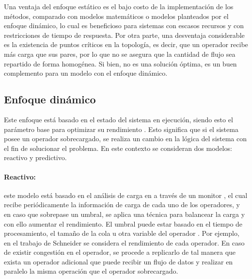 Una ventaja del enfoque est\'atico es el bajo costo de la implementaci\'on de los m\'etodos, comparado con modelos matem\'aticos o modelos planteados por el enfoque din\'amico, lo cual es beneficioso para sistemas con escasos recursos y con restricciones de tiempo de respuesta. Por otra parte, una desventaja considerable es la existencia de puntos cr\'iticos en la topolog\'ia, es decir, que un operador recibe m\'as carga que sus pares, por lo que no se asegura que la cantidad de flujo sea repartido de forma homog\'enea. Si bien, no es una soluci\'on \'optima, es un buen complemento para un modelo con el enfoque din\'amico.

\subsection{Enfoque din\'amico}
\label{subsec:enfoqueDinamicoBC}


Este enfoque est\'a basado en el estado del sistema en ejecuci\'on, siendo esto el par\'ametro base para optimizar su rendimiento \citep{CasavantK88}. Esto significa que si el sistema posee un operador sobrecargado, se realiza un cambio en la l\'ogica del sistema con el fin de solucionar el problema. En este contexto se consideran dos modelos: reactivo y predictivo.

\paragraph{Reactivo:} este modelo est\'a basado en el an\'alisis de carga en a trav\'es de un monitor \citep{GulisanoJPSV12}, el cual recibe peri\'odicamente la informaci\'on de carga de cada uno de los operadores, y en caso que sobrepase un umbral, se aplica una t\'ecnica para balancear la carga y con ello aumentar el rendimiento. El umbral puede estar basado en el tiempo de procesamiento, el tama\~no de la cola u otra variable del operador \citep{BhuvanagiriGKS06}. Por ejemplo, en el trabajo de Schneider \citep{SchneiderAGBW09} se considera el rendimiento de cada operador. En caso de existir congesti\'on en el operador, se procede a replicarlo de tal manera que exista un operador adicional que puede recibir un flujo de datos y realizar en paralelo la misma operaci\'on que el operador sobrecargado.

